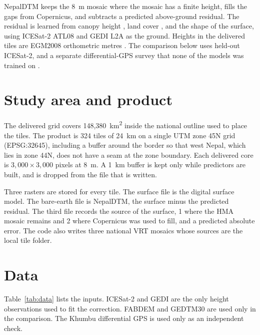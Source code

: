 \documentclass[11pt]{article}
\begin{document}
NepalDTM keeps the 8~m mosaic where the mosaic has a finite height, fills the gaps from Copernicus, and subtracts a predicted above-ground residual.
The residual is learned from canopy height \citep{tolan2024canopy}, land cover \citep{zanaga2022worldcover}, and the shape of the surface, using ICESat-2 ATL08 \citep{markus2017icesat2,neuenschwander2019atl08} and GEDI L2A \citep{dubayah2020gedi} as the ground.
Heights in the delivered tiles are EGM2008 orthometric metres \citep{pavlis2012egm2008}.
The comparison below uses held-out ICESat-2, and a separate differential-GPS survey that none of the models was trained on \citep{quincey2016khumbu}.

\section{Study area and product}

The delivered grid covers 148,380~km\textsuperscript{2} inside the national outline used to place the tiles.
The product is 324 tiles of 24~km on a single UTM zone 45N grid (EPSG:32645), including a buffer around the border so that west Nepal, which lies in zone 44N, does not have a seam at the zone boundary.
Each delivered core is $3{,}000 \times 3{,}000$ pixels at 8~m.
A 1~km buffer is kept only while predictors are built, and is dropped from the file that is written.

Three rasters are stored for every tile.
The surface file is the digital surface model.
The bare-earth file is NepalDTM, the surface minus the predicted residual.
The third file records the source of the surface, 1 where the HMA mosaic remains and 2 where Copernicus was used to fill, and a predicted absolute error.
The code also writes three national VRT mosaics whose sources are the local tile folder.

\section{Data}

Table~\ref{tab:data} lists the inputs.
ICESat-2 and GEDI are the only height observations used to fit the correction.
FABDEM and GEDTM30 are used only in the comparison.
The Khumbu differential GPS is used only as an independent check.
\end{document}
